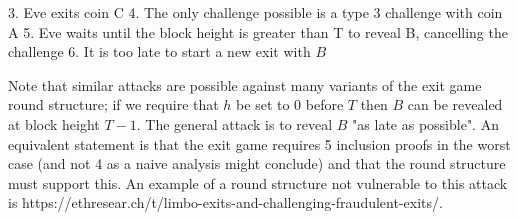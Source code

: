 \documentclass{article}
\begin{document}
3. Eve exits coin C
4. The only challenge possible is a type 3 challenge with coin A
5. Eve waits until the block height is greater than T to reveal B, cancelling the challenge
6. It is too late to start a new exit with $B$

Note that similar attacks are possible against many variants of the exit game round structure; if we require that $h$ be set to 0 before $T$ then $B$ can be revealed at block height $T-1$. The general attack is to reveal $B$ "as late as possible". An equivalent statement is that the exit game requires 5 inclusion proofs in the worst case (and not 4 as a naive analysis might conclude) and that the round structure must support this. An example of a round structure not vulnerable to this attack is https://ethresear.ch/t/limbo-exits-and-challenging-fraudulent-exits/.
\end{document}
